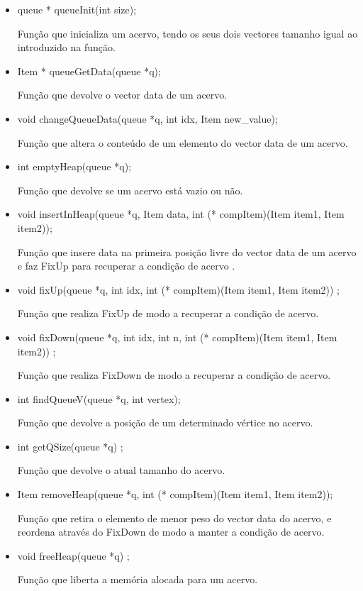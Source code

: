 \documentclass[a4paper, 11pt]{article}
\begin{document}
    \begin{itemize}  
    \item queue * queueInit(int size);
    \par Função que inicializa um acervo, tendo os seus dois vectores tamanho igual ao introduzido na função. 
    
    \item Item * queueGetData(queue *q);
    \par Função que devolve o vector data de um acervo.
    
    \item void changeQueueData(queue *q, int idx, Item new{\_}value);
    \par Função que altera o conteúdo de um elemento do vector data de um acervo.
    
    \item int emptyHeap(queue *q);
    \par Função que devolve se um acervo está vazio ou não.

    \item void insertInHeap(queue *q, Item data, int (* compItem)(Item item1, Item item2));
    \par Função que insere data na primeira posição livre do vector data de um acervo e faz FixUp para recuperar a condição de acervo .
    
    \item void fixUp(queue *q, int idx, int (* compItem)(Item item1, Item item2)) ;
    \par Função que realiza FixUp de modo a recuperar a condição de acervo.

    \item void fixDown(queue *q, int idx, int n, int (* compItem)(Item item1, Item item2)) ;
    \par Função que realiza FixDown de modo a recuperar a condição de acervo.
    
    \item int findQueueV(queue *q, int vertex);
    \par Função que devolve a posição de um determinado vértice no acervo.

    \item int getQSize(queue *q) ;
    \par Função que devolve o atual tamanho do acervo.
    
    \item Item removeHeap(queue *q, int (* compItem)(Item item1, Item item2));
    \par Função que retira o elemento de menor peso do vector data do acervo, e reordena através do FixDown de modo a manter a condição de acervo.

	\item void freeHeap(queue *q) ;
    \par Função que liberta a memória alocada para um acervo.
    \end{itemize}
\end{document}
